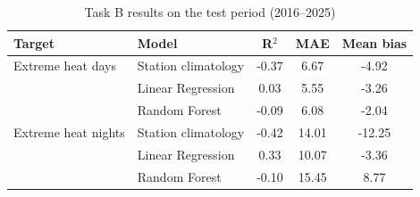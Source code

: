 \begin{table}[htbp]
\caption{Task B results on the test period (2016--2025)}
\label{tab:taskB}
\centering
\footnotesize
\begin{tabular}{|l|l|c|c|c|}
\hline
\textbf{Target} & \textbf{Model} & \textbf{R$^2$} & \textbf{MAE} & \textbf{Mean bias} \\
\hline
Extreme heat days & Station climatology & -0.37 & 6.67 & -4.92 \\
 & Linear Regression & 0.03 & 5.55 & -3.26 \\
 & Random Forest & -0.09 & 6.08 & -2.04 \\
\hline
Extreme heat nights & Station climatology & -0.42 & 14.01 & -12.25 \\
 & Linear Regression & 0.33 & 10.07 & -3.36 \\
 & Random Forest & -0.10 & 15.45 & 8.77 \\
\hline
\end{tabular}
\end{table}